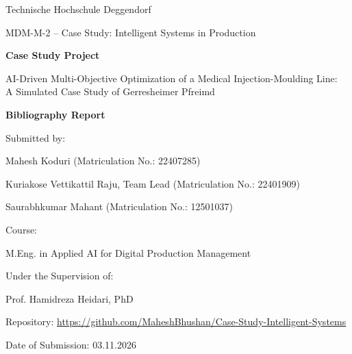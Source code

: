 \documentclass[11pt,a4paper]{article}
\begin{document}
\begin{titlepage}
\centering
{\large Technische Hochschule Deggendorf\par}
{\large MDM-M-2 -- Case Study: Intelligent Systems in Production\par}
\vspace{2cm}
{\LARGE\bfseries Case Study Project\par}
\vspace{0.6cm}
{\Large AI-Driven Multi-Objective Optimization of a Medical Injection-Moulding Line:\\ A Simulated Case Study of Gerresheimer Pfreimd\par}
\vspace{0.6cm}
{\LARGE\bfseries Bibliography Report\par}
\vspace{1.5cm}
{\large Submitted by:\par}
\vspace{0.2cm}
Mahesh Koduri (Matriculation No.: 22407285)\par
Kuriakose Vettikattil Raju, Team Lead (Matriculation No.: 22401909)\par
Saurabhkumar Mahant (Matriculation No.: 12501037)\par
\vspace{1cm}
{\large Course:\par}
M.Eng. in Applied AI for Digital Production Management\par
\vspace{1cm}
{\large Under the Supervision of:\par}
Prof. Hamidreza Heidari, PhD\par
\vspace{0.5cm}
Repository: \url{https://github.com/MaheshBhushan/Case-Study-Intelligent-Systems}\par
\vfill
{\large Date of Submission: 03.11.2026\par}
\end{titlepage}
\end{document}

